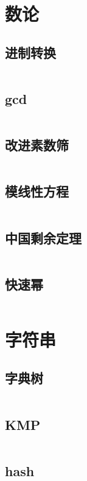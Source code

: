 \documentclass[a4paper,11pt]{article}
\begin{document}
\section{数论}
\subsection{进制转换}
\inputminted[breaklines]{c++}{number_theory/base_conversion.cpp}
\subsection{gcd}
\inputminted[breaklines]{c++}{number_theory/gcd.cpp}
\subsection{改进素数筛}
\inputminted[breaklines]{c++}{number_theory/prime.cpp}
\subsection{模线性方程}
\inputminted[breaklines]{c++}{number_theory/modequ.cpp}

\subsection{中国剩余定理}
\inputminted[breaklines]{c++}{number_theory/china.cpp}
\subsection{快速幂}
\inputminted[breaklines]{c++}{number_theory/pow_mod.cpp}





\section{字符串}
\subsection{字典树}
\inputminted[breaklines]{c++}{string/trie.cpp}
\subsection{KMP}
\inputminted[breaklines]{c++}{string/kmp.cpp}
\subsection{hash}
\inputminted[breaklines]{c++}{string/hash.cpp}
\end{document}
